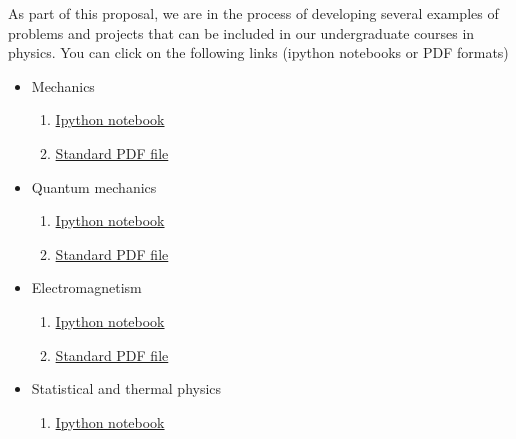 \documentclass[%
oneside,                 %
final,                   %
10pt]{article}
\begin{document}
As part of this proposal, we are in the process of  developing several examples of problems and projects that can be included in our undergraduate courses in physics. You can click on the following links (ipython notebooks or PDF formats)
\begin{itemize}
\item Mechanics
\begin{enumerate}

  \item \href{{https://github.com/CompPhysics/PAComputationsMSU/tree/master/doc/pub/Mechanics/ipynb}}{Ipython notebook}

  \item \href{{https://github.com/CompPhysics/PAComputationsMSU/tree/master/doc/pub/Mechanics/pdf/Mechanics-minted.pdf}}{Standard PDF file}

\end{enumerate}

\noindent
\item Quantum mechanics
\begin{enumerate}

  \item \href{{https://github.com/CompPhysics/PAComputationsMSU/tree/master/doc/pub/Quantum/ipynb}}{Ipython notebook}

  \item \href{{https://github.com/CompPhysics/PAComputationsMSU/tree/master/doc/pub/Quantum/pdf/Quantum-minted.pdf}}{Standard PDF file}

\end{enumerate}

\noindent
\item Electromagnetism
\begin{enumerate}

  \item \href{{https://github.com/CompPhysics/PAComputationsMSU/tree/master/doc/pub/Elmag/ipynb}}{Ipython notebook}

  \item \href{{https://github.com/CompPhysics/PAComputationsMSU/tree/master/doc/pub/Elmag/pdf/Elmag-minted.pdf}}{Standard PDF file}

\end{enumerate}

\noindent
\item Statistical and thermal physics
\begin{enumerate}

  \item \href{{https://github.com/CompPhysics/PAComputationsMSU/tree/master/doc/pub/StatPhys/ipynb}}{Ipython notebook}


\end{enumerate}
\end{itemize}
\end{document}
